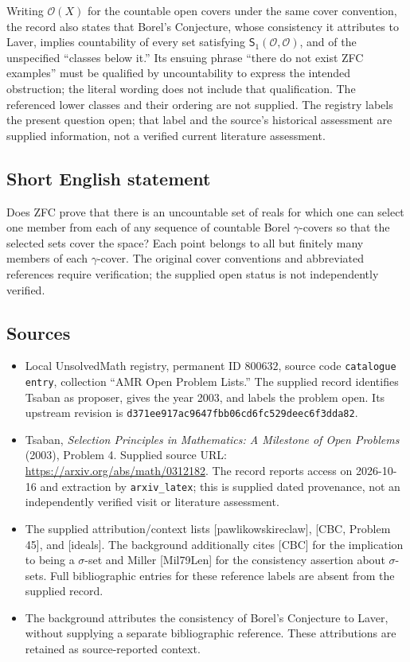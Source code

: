 \documentclass[11pt]{article}
\begin{document}
Writing \(\mathcal O(X)\) for the countable open covers under the same cover convention, the record also states that Borel's Conjecture, whose consistency it attributes to Laver, implies countability of every set satisfying \(\mathsf S_1(\mathcal O,\mathcal O)\), and of the unspecified ``classes below it.'' Its ensuing phrase ``there do not exist ZFC examples'' must be qualified by uncountability to express the intended obstruction; the literal wording does not include that qualification. The referenced lower classes and their ordering are not supplied. The registry labels the present question open; that label and the source's historical assessment are supplied information, not a verified current literature assessment.
\subsection{Short English statement}
Does ZFC prove that there is an uncountable set of reals for which one can select one member from each of any sequence of countable Borel \(\gamma\)-covers so that the selected sets cover the space? Each point belongs to all but finitely many members of each \(\gamma\)-cover. The original cover conventions and abbreviated references require verification; the supplied open status is not independently verified.
\subsection{Sources}
\begin{itemize}
\item Local UnsolvedMath registry, permanent ID \(800632\), source code \texttt{catalogue entry}, collection ``AMR Open Problem Lists.'' The supplied record identifies Tsaban as proposer, gives the year 2003, and labels the problem open. Its upstream revision is \texttt{d371ee917ac9647fbb06cd6fc529deec6f3dda82}.
\item Tsaban, \emph{Selection Principles in Mathematics: A Milestone of Open Problems} (2003), Problem 4. Supplied source URL: \url{https://arxiv.org/abs/math/0312182}. The record reports access on 2026-10-16 and extraction by \texttt{arxiv\_latex}; this is supplied dated provenance, not an independently verified visit or literature assessment.
\item The supplied attribution/context lists [pawlikowskireclaw], [CBC, Problem 45], and [ideals]. The background additionally cites [CBC] for the implication to being a \(\sigma\)-set and Miller [Mil79Len] for the consistency assertion about \(\sigma\)-sets. Full bibliographic entries for these reference labels are absent from the supplied record.
\item The background attributes the consistency of Borel's Conjecture to Laver, without supplying a separate bibliographic reference. These attributions are retained as source-reported context.
\end{itemize}
\end{document}
